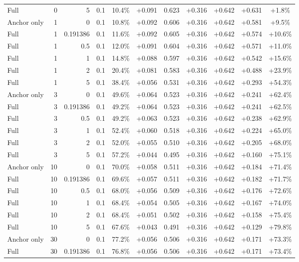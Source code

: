 \begin{table}[htbp]
\begin{tabular}{lrrrccccccc}
Full & 0 & 5 & 0.1 & 10.4\% & +0.091 & 0.623 & +0.316 & +0.642 & +0.631 & +1.8\% \\
Anchor only & 1 & 0 & 0.1 & 10.8\% & +0.092 & 0.606 & +0.316 & +0.642 & +0.581 & +9.5\% \\
Full & 1 & 0.191386 & 0.1 & 11.6\% & +0.092 & 0.605 & +0.316 & +0.642 & +0.574 & +10.6\% \\
Full & 1 & 0.5 & 0.1 & 12.0\% & +0.091 & 0.604 & +0.316 & +0.642 & +0.571 & +11.0\% \\
Full & 1 & 1 & 0.1 & 14.8\% & +0.088 & 0.597 & +0.316 & +0.642 & +0.542 & +15.6\% \\
Full & 1 & 2 & 0.1 & 20.4\% & +0.081 & 0.583 & +0.316 & +0.642 & +0.488 & +23.9\% \\
Full & 1 & 5 & 0.1 & 38.4\% & +0.056 & 0.531 & +0.316 & +0.642 & +0.293 & +54.3\% \\
Anchor only & 3 & 0 & 0.1 & 49.6\% & +0.064 & 0.523 & +0.316 & +0.642 & +0.241 & +62.4\% \\
Full & 3 & 0.191386 & 0.1 & 49.2\% & +0.064 & 0.523 & +0.316 & +0.642 & +0.241 & +62.5\% \\
Full & 3 & 0.5 & 0.1 & 49.2\% & +0.063 & 0.523 & +0.316 & +0.642 & +0.238 & +62.9\% \\
Full & 3 & 1 & 0.1 & 52.4\% & +0.060 & 0.518 & +0.316 & +0.642 & +0.224 & +65.0\% \\
Full & 3 & 2 & 0.1 & 52.0\% & +0.055 & 0.510 & +0.316 & +0.642 & +0.205 & +68.0\% \\
Full & 3 & 5 & 0.1 & 57.2\% & +0.044 & 0.495 & +0.316 & +0.642 & +0.160 & +75.1\% \\
Anchor only & 10 & 0 & 0.1 & 70.0\% & +0.058 & 0.511 & +0.316 & +0.642 & +0.184 & +71.4\% \\
Full & 10 & 0.191386 & 0.1 & 69.6\% & +0.057 & 0.511 & +0.316 & +0.642 & +0.182 & +71.7\% \\
Full & 10 & 0.5 & 0.1 & 68.0\% & +0.056 & 0.509 & +0.316 & +0.642 & +0.176 & +72.6\% \\
Full & 10 & 1 & 0.1 & 68.4\% & +0.054 & 0.505 & +0.316 & +0.642 & +0.167 & +74.0\% \\
Full & 10 & 2 & 0.1 & 68.4\% & +0.051 & 0.502 & +0.316 & +0.642 & +0.158 & +75.4\% \\
Full & 10 & 5 & 0.1 & 67.6\% & +0.043 & 0.491 & +0.316 & +0.642 & +0.129 & +79.8\% \\
Anchor only & 30 & 0 & 0.1 & 77.2\% & +0.056 & 0.506 & +0.316 & +0.642 & +0.171 & +73.3\% \\
Full & 30 & 0.191386 & 0.1 & 76.8\% & +0.056 & 0.506 & +0.316 & +0.642 & +0.171 & +73.4\% \\

\end{tabular}
\end{table}
